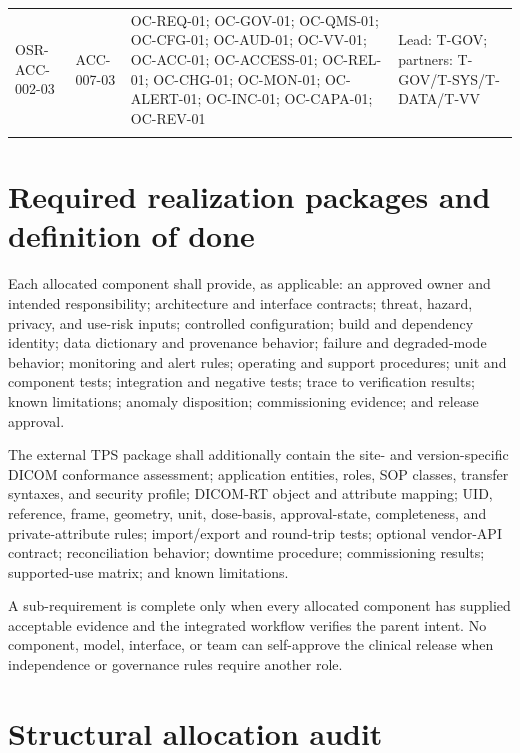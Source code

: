 \documentclass[11pt,letterpaper]{article}
\begin{document}
\begin{scriptsize}
\begin{longtable}{@{}L{0.16\textwidth}L{0.12\textwidth}L{0.49\textwidth}L{0.17\textwidth}@{}}
\addlinespace[2pt]
\mbox{OSR-ACC-002-03} & \mbox{ACC-007-03} & OC-REQ-01; OC-GOV-01; OC-QMS-01; OC-CFG-01; OC-AUD-01; OC-VV-01; OC-ACC-01; OC-ACCESS-01; OC-REL-01; OC-CHG-01; OC-MON-01; OC-ALERT-01; OC-INC-01; OC-CAPA-01; OC-REV-01 & Lead: T-GOV; partners: T-GOV\slash\allowbreak{}T-SYS\slash\allowbreak{}T-DATA\slash\allowbreak{}T-VV \\
\addlinespace[2pt]
\end{longtable}
\end{scriptsize}

\section{Required realization packages and definition of done}

Each allocated component shall provide, as applicable: an approved owner and intended responsibility; architecture and interface contracts; threat, hazard, privacy, and use-risk inputs; controlled configuration; build and dependency identity; data dictionary and provenance behavior; failure and degraded-mode behavior; monitoring and alert rules; operating and support procedures; unit and component tests; integration and negative tests; trace to verification results; known limitations; anomaly disposition; commissioning evidence; and release approval.

The external TPS package shall additionally contain the site- and version-specific DICOM conformance assessment; application entities, roles, SOP classes, transfer syntaxes, and security profile; DICOM-RT object and attribute mapping; UID, reference, frame, geometry, unit, dose-basis, approval-state, completeness, and private-attribute rules; import/export and round-trip tests; optional vendor-API contract; reconciliation behavior; downtime procedure; commissioning results; supported-use matrix; and known limitations.

A sub-requirement is complete only when every allocated component has supplied acceptable evidence and the integrated workflow verifies the parent intent. No component, model, interface, or team can self-approve the clinical release when independence or governance rules require another role.

\section{Structural allocation audit}
\end{document}
